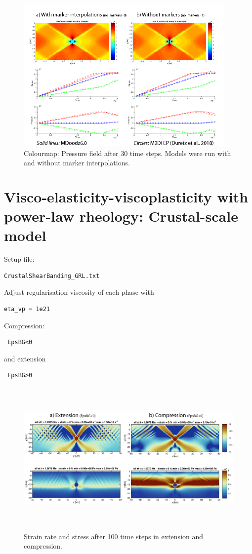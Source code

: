 \documentclass[12pt,english,openany]{scrbook}
\begin{document}
\begin{figure}[ht!]
\centerline{\includegraphics[height=3.0in]{./Figures/VEP_Duretz18_MDOODZ.png}}
\caption{Colourmap: Pressure field after 30 time steps. Models were run with and without marker interpolations.}
\label{VEP_Duretz18}
\end{figure}

\section{Visco-elasticity-viscoplasticity with power-law rheology: Crustal-scale model}

Setup file:
\begin{verbatim} 
CrustalShearBanding_GRL.txt
\end{verbatim}

Adjust regularisation viscosity of each phase with
\begin{verbatim} 
eta_vp = 1e21
\end{verbatim}

Compression: \begin{verbatim} EpsBG<0 \end{verbatim}
and extension \begin{verbatim} EpsBG>0 \end{verbatim}

\begin{figure}[ht!]
\centerline{\includegraphics[height=3.0in]{./Figures/Extension_Compression_MDOODZ.png}}
\caption{Strain rate and stress after 100 time steps in extension and compression.}
\label{Extension_Compression_MDOODZ}
\end{figure}
\end{document}
